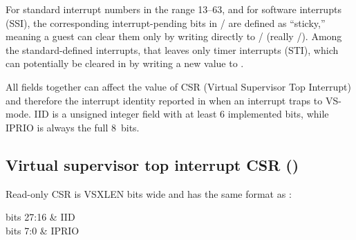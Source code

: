 \begin{commentary}
For standard interrupt numbers in the range 13--63, and for
software interrupts (SSI), the corresponding interrupt-pending
bits in / are defined as ``sticky,''
meaning a guest can clear them only by writing directly
to / (really /).
Among the standard-defined interrupts, that leaves only
timer interrupts (STI), which can potentially be cleared
in  by writing a new value to .
\end{commentary}

All  fields together can affect
the value of CSR  (Virtual Supervisor Top Interrupt) and
therefore the interrupt identity reported in  when an
interrupt traps to \mbox{VS-mode}.
IID is a {\WARL} unsigned integer field with at least 6 implemented
bits, while IPRIO is always the full 8~bits.

\subsection{Virtual supervisor top interrupt CSR ()}

Read-only CSR  is VSXLEN bits wide and has the same format as
:\nopagebreak
\begin{displayLinesTable}[l@{\quad}l]
bits 27:16 & IID \\
bits 7:0   & IPRIO \\
\end{displayLinesTable}

